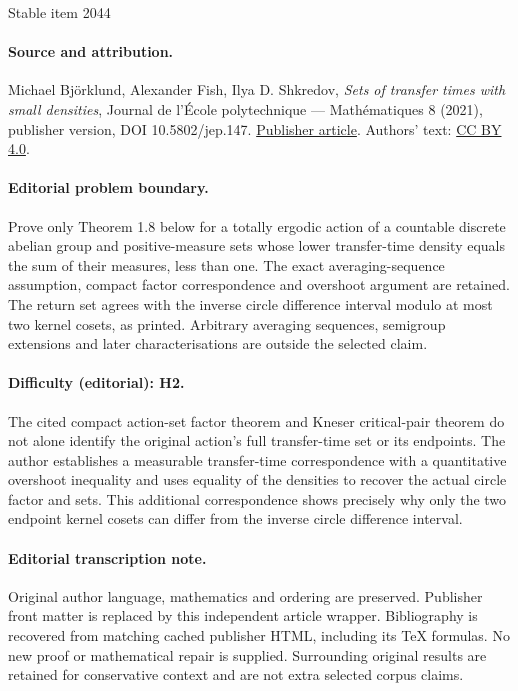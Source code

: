 \documentclass[11pt]{article}
\numberwithin{equation}{section}
\theoremstyle{plain}
\theoremstyle{definition}
\begin{document}
\begin{center}{\Large Stable item 2044}\end{center}
\paragraph{Source and attribution.}
Michael Björklund, Alexander Fish, Ilya D. Shkredov, \emph{Sets of transfer times with small densities}, Journal de l’École polytechnique — Mathématiques 8 (2021), publisher version, DOI 10.5802/jep.147. \href{https://jep.centre-mersenne.org/articles/10.5802/jep.147/}{Publisher article}. Authors' text: \href{https://creativecommons.org/licenses/by/4.0/}{CC BY 4.0}.
\paragraph{Editorial problem boundary.}
Prove only Theorem 1.8 below for a totally ergodic action of a countable discrete abelian group and positive-measure sets whose lower transfer-time density equals the sum of their measures, less than one. The exact averaging-sequence assumption, compact factor correspondence and overshoot argument are retained. The return set agrees with the inverse circle difference interval modulo at most two kernel cosets, as printed. Arbitrary averaging sequences, semigroup extensions and later characterisations are outside the selected claim.
\paragraph{Difficulty (editorial): H2.}
The cited compact action-set factor theorem and Kneser critical-pair theorem do not alone identify the original action's full transfer-time set or its endpoints. The author establishes a measurable transfer-time correspondence with a quantitative overshoot inequality and uses equality of the densities to recover the actual circle factor and sets. This additional correspondence shows precisely why only the two endpoint kernel cosets can differ from the inverse circle difference interval.
\paragraph{Editorial transcription note.}
Original author language, mathematics and ordering are preserved. Publisher front matter is replaced by this independent article wrapper. Bibliography is recovered from matching cached publisher HTML, including its TeX formulas. No new proof or mathematical repair is supplied. Surrounding original results are retained for conservative context and are not extra selected corpus claims.
\clearpage
\end{document}

